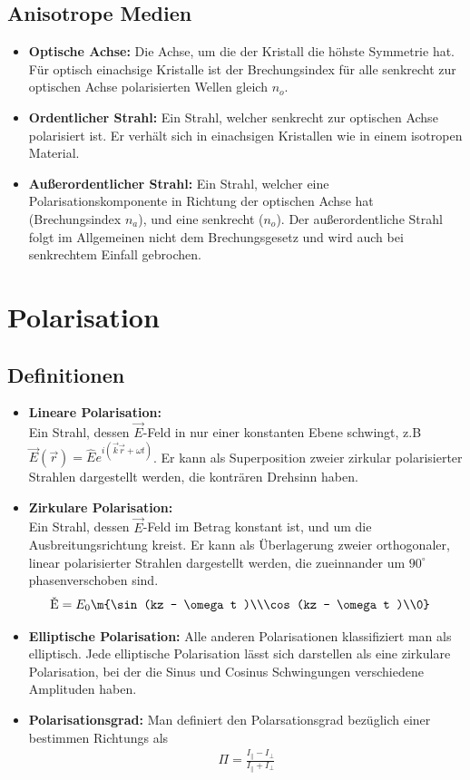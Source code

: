 \documentclass[twocolumn, unnumberedsubsub]{summery_5.0} %
\begin{document}
\subsection{Anisotrope Medien}
\begin{itemize}
    \item {\bf Optische Achse:} Die Achse, um die der Kristall die höhste Symmetrie hat. Für optisch einachsige Kristalle ist der Brechungsindex für alle senkrecht zur optischen Achse polarisierten Wellen gleich $n_o$.
    \item {\bf Ordentlicher Strahl:} Ein Strahl, welcher senkrecht zur optischen Achse polarisiert ist. Er verhält sich in einachsigen Kristallen wie in einem isotropen Material.
    \item {\bf Außerordentlicher Strahl:} Ein Strahl, welcher eine Polarisationskomponente in Richtung der optischen Achse hat (Brechungsindex $n_a$), und eine senkrecht ($n_o$). Der außerordentliche Strahl
    folgt im Allgemeinen nicht dem Brechungsgesetz und wird auch bei senkrechtem Einfall gebrochen.
\end{itemize}

\section{Polarisation}
\subsection{Definitionen}
\begin{itemize}
    \item {\bf Lineare Polarisation:}\\
    Ein Strahl, dessen \(\vec E\)-Feld in nur einer konstanten Ebene schwingt, z.B 
    $\vec E(\vec r) = \hat E e^{i(\vec k \vec r + \omega t)}$. Er kann als Superposition zweier zirkular polarisierter Strahlen dargestellt werden, 
    die konträren Drehsinn haben.
    \item {\bf Zirkulare Polarisation:}\\
    Ein Strahl, dessen \(\vec E\)-Feld im Betrag konstant ist, und um die Ausbreitungsrichtung
    kreist. Er kann als Überlagerung zweier orthogonaler, linear polarisierter
    Strahlen dargestellt werden, die zueinnander um \(90^\circ\) phasenverschoben sind.
    \begin{align*}
        \v E &= E_0 \m{\sin(kz - \omega t )\\\cos(kz - \omega t )\\0}
    \end{align*}
    \item{\bf Elliptische Polarisation:} 
    Alle anderen Polarisationen klassifiziert man als elliptisch. Jede elliptische Polarisation lässt sich darstellen als eine zirkulare Polarisation, bei der die Sinus und Cosinus Schwingungen verschiedene Amplituden haben.
    \item{\bf Polarisationsgrad:} Man definiert den Polarsationsgrad bezüglich einer bestimmen Richtungs als 
    \begin{align*}
        \Pi = \frac{I_\parallel-I_\perp}{I_\parallel+I_\perp}
    \end{align*}
\end{itemize}
\end{document}
